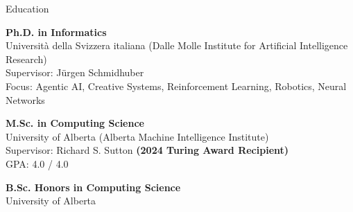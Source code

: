 \documentclass[a4paper,dateabbrev]{cv}
\begin{document}

\begin{rSection}{Education}

{\bf Ph.D. in Informatics} \hfill {} \\[0.05em]
Universit{\`{a}} della Svizzera italiana (Dalle Molle Institute for Artificial Intelligence Research) \\[0.05em]
Supervisor: J{\"u}rgen Schmidhuber \\[0.05em]
Focus: Agentic AI, Creative Systems, Reinforcement Learning, Robotics, Neural Networks


{\bf M.Sc. in Computing Science} \hfill {} \\[0.05em]
University of Alberta (Alberta Machine Intelligence Institute) \\[0.05em]
Supervisor: Richard S. Sutton \textbf{(2024 Turing Award Recipient)} \\[0.05em]
GPA: 4.0 / 4.0


{\bf B.Sc. Honors in Computing Science} \hfill {} \\[0.05em]
University of Alberta

\end{rSection}

\end{document}
